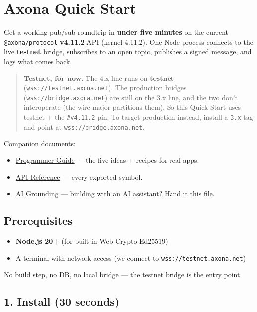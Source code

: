 \documentclass[
  nobib]{tufte-handout}
\author{}
\date{}
\providecommand{\tightlist}{%
  \setlength{\itemsep}{0pt}\setlength{\parskip}{0pt}}
\begin{document}
\section{Axona Quick Start}\label{axona-quick-start}

Get a working pub/sub roundtrip in \textbf{under five minutes} on the
current \texttt{@axona/protocol} \textbf{v4.11.2} API (kernel 4.11.2).
One Node process connects to the live \textbf{testnet} bridge,
subscribes to an open topic, publishes a signed message, and logs what
comes back.

\begin{quote}
\textbf{Testnet, for now.} The 4.x line runs on \textbf{testnet}
(\texttt{wss://testnet.axona.net}). The production bridges
(\texttt{wss://bridge.axona.net}) are still on the 3.x line, and the two
don't interoperate (the wire major partitions them). So this Quick Start
uses testnet + the \texttt{\#v4.11.2} pin. To target production instead,
install a \texttt{3.x} tag and point at \texttt{wss://bridge.axona.net}.
\end{quote}

Companion documents:

\begin{itemize}
\tightlist
\item
  \href{Axona-Programmer-Guide-v4.11.2.md}{Programmer Guide} --- the
  five ideas + recipes for real apps.
\item
  \href{Axona-API-Reference-v4.11.2.md}{API Reference} --- every
  exported symbol.
\item
  \href{Axona-AI-Grounding-v4.11.2.md}{AI Grounding} --- building with
  an AI assistant? Hand it this file.
\end{itemize}

\subsection{Prerequisites}\label{prerequisites}

\begin{itemize}
\tightlist
\item
  \textbf{Node.js 20+} (for built-in Web Crypto Ed25519)
\item
  A terminal with network access (we connect to
  \texttt{wss://testnet.axona.net})
\end{itemize}

No build step, no DB, no local bridge --- the testnet bridge is the
entry point.

\subsection{1. Install (30 seconds)}\label{install-30-seconds}
\end{document}
